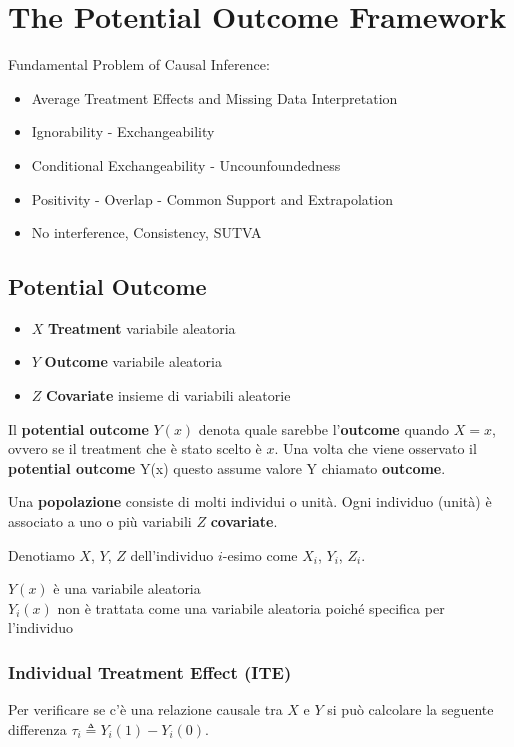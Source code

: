 \chapter{The Potential Outcome Framework}

Fundamental Problem of Causal Inference:
\begin{itemize}
  \item Average Treatment Effects and Missing Data Interpretation
  \item Ignorability - Exchangeability
  \item Conditional Exchangeability - Uncounfoundedness
  \item Positivity - Overlap - Common Support and Extrapolation
  \item No interference, Consistency, SUTVA
\end{itemize}

\section{Potential Outcome}

\begin{itemize}
  \item $X$ \textbf{Treatment} variabile aleatoria
  \item $Y$ \textbf{Outcome} variabile aleatoria
  \item $Z$ \textbf{Covariate} insieme di variabili aleatorie
\end{itemize}

Il \textbf{potential outcome} $Y(x)$ denota quale sarebbe l'\textbf{outcome} quando $X = x$, ovvero se il treatment che è stato scelto è $x$.
Una volta che viene osservato il \textbf{potential outcome} Y(x) questo assume valore Y chiamato \textbf{outcome}.

Una \textbf{popolazione} consiste di molti individui o unità.
Ogni individuo (unità) è associato a uno o più variabili $Z$ \textbf{covariate}.

Denotiamo $X$, $Y$, $Z$ dell'individuo $i$-esimo come $X_i$, $Y_i$, $Z_i$.

$Y(x)$ è una variabile aleatoria\\
$Y_i(x)$ non è trattata come una variabile aleatoria poiché specifica per l'individuo

\subsection*{Individual Treatment Effect (ITE)}
Per verificare se c'è una relazione causale tra $X$ e $Y$ si può calcolare la seguente differenza
$\tau_i \triangleq Y_i(1) - Y_i(0)$.

